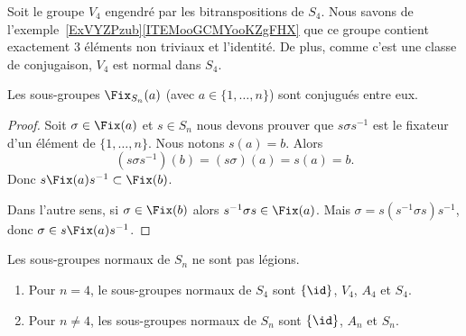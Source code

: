\begin{normaltext}     \label{NORMooQAZTooBQLqDn}
    Soit le groupe \( V_4\) engendré par les bitranspositions de \( S_4\). Nous savons de l'exemple~\ref{ExVYZPzub}\ref{ITEMooGCMYooKZgFHX} que ce groupe contient exactement \( 3\) éléments non triviaux et l'identité. De plus, comme c'est une classe de conjugaison, \( V_4\) est normal dans \( S_4\).
\end{normaltext}

\begin{lemma}
    Les sous-groupes \( \Fix_{S_n}(a)\) (avec \( a\in\{ 1,\ldots, n \}\)) sont conjugués entre eux.
\end{lemma}

\begin{proof}
    Soit \( \sigma\in \Fix(a)\) et \( s\in S_n\) nous devons prouver que \( s \sigma s^{-1}\) est le fixateur d'un élément de \( \{ 1,\ldots, n \}\). Nous notons \( s(a)=b\). Alors
    \begin{equation}
        (s\sigma s^{-1})(b)=(s\sigma)(a)=s(a)=b.
    \end{equation}
    Donc \( s\Fix(a)s^{-1}\subset \Fix(b)\).

    Dans l'autre sens, si \( \sigma\in \Fix(b)\) alors \( s^{-1} \sigma s\in\Fix(a)\). Mais \( \sigma=s(s^{-1}\sigma s)s^{-1}\), donc \( \sigma\in s\Fix(a)s^{-1}\).
\end{proof}

\begin{proposition}     \label{PROPooOTJAooUbzGZm}
    Les sous-groupes normaux de \( S_n\) ne sont pas légions.
    \begin{enumerate}
        \item
            Pour \( n=4\), le sous-groupes normaux de \( S_4\) sont \(  \{ \id \}  \), \( V_4\), \( A_4\) et \( S_4\).
        \item
            Pour \( n\neq 4\), les sous-groupes normaux de \( S_n\) sont \( \{ \id \}\), \( A_n\) et \( S_n\).
    \end{enumerate}
\end{proposition}

